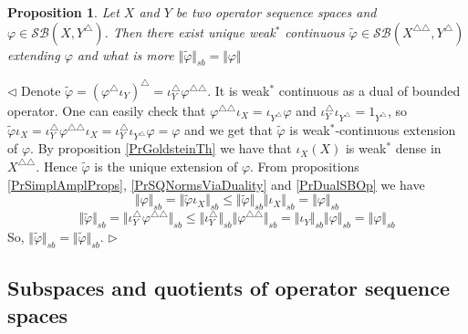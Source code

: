 \documentclass[12pt]{article}
\newtheorem{proposition}[theorem]{Proposition}
\newenvironment{proof}{\par $\triangleleft$}{$\triangleright$}
\begin{document}
\begin{proposition}\label{PrWStarContExtSBOp} Let $X$ and $Y$ be two operator sequence spaces and $\varphi\in \mathcal{SB}(X,Y^\triangle)$. Then there exist unique weak${}^*$ continuous $\widetilde{\varphi}\in\mathcal{SB}(X^{\triangle\triangle},Y^\triangle)$ extending $\varphi$ and what is more $\Vert\widetilde{\varphi}\Vert_{sb}=\Vert\varphi\Vert$ 
\end{proposition}
\begin{proof} Denote $\widetilde{\varphi}=(\varphi^\triangle\iota_Y)^\triangle=\iota_{Y}^\triangle\varphi^{\triangle\triangle}$. It is weak${}^*$ continuous as a dual of bounded operator. One can easily check that $\varphi^{\triangle\triangle}\iota_X=\iota_{Y^\triangle}\varphi$ and $\iota_Y^\triangle\iota_{Y^\triangle}=1_{Y^\triangle}$, so $\widetilde{\varphi}\iota_X=\iota_{Y}^\triangle\varphi^{\triangle\triangle}\iota_X=\iota_{Y}^\triangle\iota_{Y^\triangle}\varphi=\varphi$ and we get that $\widetilde{\varphi}$ is weak${}^*$-continuous extension of $\varphi$. By proposition \ref{PrGoldsteinTh} we have that $\iota_X(X)$ is weak${}^*$ dense in $X^{\triangle\triangle}$. Hence $\widetilde{\varphi}$ is the unique extension of  $\varphi$. From propositions \ref{PrSimplAmplProps}, \ref{PrSQNormsViaDuality} and \ref{PrDualSBOp} we have
$$
\Vert\varphi\Vert_{sb}
=\Vert\widetilde{\varphi}\iota_X\Vert_{sb}
\leq\Vert\widetilde{\varphi}\Vert_{sb}\Vert\iota_X\Vert_{sb}
=\Vert\varphi\Vert_{sb}
$$
$$
\Vert\widetilde{\varphi}\Vert_{sb}
=\Vert\iota_{Y}^\triangle\varphi^{\triangle\triangle}\Vert_{sb}
\leq\Vert\iota_{Y}^\triangle\Vert_{sb}\Vert\varphi^{\triangle\triangle}\Vert_{sb}
=\Vert\iota_{Y}\Vert_{sb}\Vert\varphi\Vert_{sb}
=\Vert\varphi\Vert_{sb}
$$
So, $\Vert\widetilde{\varphi}\Vert_{sb}=\Vert\widetilde{\varphi}\Vert_{sb}$.
\end{proof}


































\subsection{Subspaces and quotients of operator sequence spaces}
\end{document}
